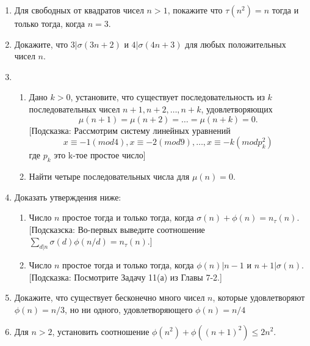 \documentclass[11pt]{article}
\begin{document}
\begin{enumerate}
  \item  Для свободных от квадратов чисел $n > 1$, покажите что $\tau(n^2) = n$ тогда и только тогда, когда $n = 3$.
  \item Докажите, что $3 | \sigma(3n+2)$ и $4 | \sigma(4n + 3)$ для любых положительных чисел $n$. 
  \item
    \begin{enumerate}
        \item Дано $k > 0$, установите, что существует последовательность из $k$ последовательных чисел $n+1, n+2, \dots , n+k$, удовлетворяющих
        \[\mu (n+1) = \mu (n+2) = \dots = \mu (n+k) = 0.\]
        [Подсказка: Рассмотрим систему линейных уравнений
        \[ x \equiv -1 (mod 4), x \equiv -2 (mod 9), \dots , x \equiv -k (mod p_k^2) \]
        где $p_k$ это k-тое простое число]
        \item Найти четыре последовательных числа для $\mu(n) = 0.$
    \end{enumerate}
  \item Доказать утверждения ниже:
    \begin{enumerate}
        \item Число $n$ простое тогда и только тогда, когда $\sigma(n) + \phi(n) = n_{\tau}(n)$. [Подсказска: Во-первых выведите соотношение $\sum_{d|n} \sigma(d)\phi(n/d) = n_{\tau}(n).$]
        \item Число $n$ простое тогда и только тогда, когда $\phi(n) | n - 1$ и $ n + 1 | \sigma(n)$. [Подсказка: Посмотрите Задачу 11(а) из Главы 7-2.]
    \end{enumerate}
  \item Докажите, что существует бесконечно много чисел $n$, которые удовлетворяют $\phi(n) = n/3$, но ни одного, удовлетворяющего $\phi(n) = n/4$
  \item Для $n > 2$, установить соотношение $\phi(n^2) + \phi((n+1)^2) \leq 2n^2$.
\end{enumerate}
\end{document}
